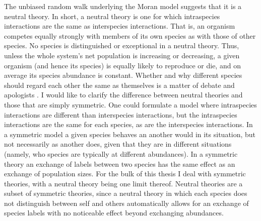 The unbiased random walk underlying the Moran model suggests that it is a neutral theory. %
In short, a neutral theory is one for which intraspecies interactions are the same as interspecies interactions. 
That is, an organism competes equally strongly with members of its own species as with those of other species. 
No species is distinguished or exceptional in a neutral theory. 
Thus, unless the whole system's net population is increasing or decreasing, a given organism (and hence its species) is equally likely to reproduce or die, and on average its species abundance is constant. 
Whether and why different species should regard each other the same as themselves is a matter of debate and apologists \cite{Hubbell2001,Leibold2006,Leigh2007,Rosindell2011}. 
I would like to clarify the difference between neutral theories and those that are simply symmetric. 
One could formulate a model where intraspecies interactions are different than interspecies interactions, but the intraspecies interactions are the same for each species, as are the interspecies interactions. 
In a symmetric model a given species behaves an another would in its situation, but not necessarily as another does, given that they are in different situations (namely, who species are typically at different abundances). 
In a symmetric theory an exchange of labels between two species has the same effect as an exchange of population sizes. 
For the bulk of this thesis I deal with symmetric theories, with a neutral theory being one limit thereof. 
Neutral theories are a subset of symmetric theories, since a neutral theory in which each species does not distinguish between self and others automatically allows for an exchange of species labels with no noticeable effect beyond exchanging abundances. 

